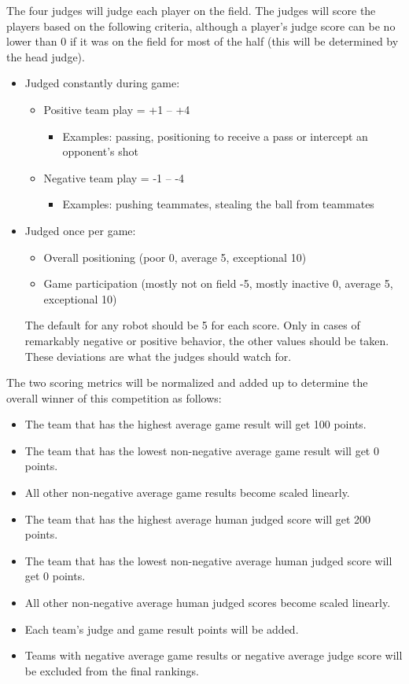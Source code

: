 \documentclass[12pt]{article}
\begin{document}
The four judges will judge each player on the field.  The judges will score the players based on the following criteria, although a player's judge score can be no lower than 0 if it was on the field for most of the half (this will be determined by the head judge).
\begin{itemize}
\item Judged constantly during game:
  \begin{itemize}
  \item Positive team play = +1 -- +4
  \begin{itemize}
  \item Examples: passing, positioning to receive a pass or intercept an opponent's shot
  \end{itemize}
  \item Negative team play = -1 -- -4
  \begin{itemize}
  \item Examples: pushing teammates, stealing the ball from teammates
  \end{itemize}
  \end{itemize}
\item Judged once per game:
  \begin{itemize}
  \item Overall positioning (poor 0, average 5, exceptional 10)
  \item Game participation (mostly not on field -5, mostly inactive 0, average 5, exceptional 10)
  \end{itemize}
  The default for any robot should be 5 for each score. Only in cases of remarkably negative or positive behavior, the other values should be taken. These deviations are what the judges should watch for.
\end{itemize}

The two scoring metrics will be normalized and added up to determine the overall winner of this competition as follows:
\begin{itemize}
\item The team that has the highest average game result will get 100 points.
\item The team that has the lowest non-negative average game result will get 0 points.
\item All other non-negative average game results become scaled linearly. 
\item The team that has the highest average human judged score will get 200 points.
\item The team that has the lowest non-negative average human judged score will get 0 points.
\item All other non-negative average human judged scores become scaled linearly. 
\item Each team's judge and game result points will be added.
\item Teams with negative average game results or negative average judge score will be excluded from the final rankings.
\end{itemize}
\end{document}
